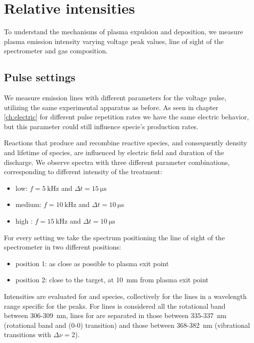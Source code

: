 \section{Relative intensities}
To understand the mechanisms of plasma expulsion and deposition, we measure plasma emission intensity varying voltage peak values, line of sight of the spectrometer and gas composition.


\subsection{Pulse settings}
We measure emission lines with different parameters for the voltage pulse, utilizing the same experimental apparatus as before. As seen in chapter \ref{ch:electric} for different pulse repetition rates we have the same electric behavior, but this parameter could still influence specie's production rates.

Reactions that produce and recombine reactive species, and consequently density and lifetime of species, are influenced by electric field and duration of the discharge. We observe spectra with three different parameter combinations, corresponding to different intensity of the treatment:
\begin{itemize}
 \item low: $f = \SI{5}{\kilo\hertz}$ and $\Delta t = \SI{15}{\micro\second}$
 \item medium: $f = \SI{10}{\kilo\hertz}$ and $\Delta t = \SI{10}{\micro\second}$
 \item high : $f = \SI{15}{\kilo\hertz}$ and $\Delta t = \SI{10}{\micro\second}$
\end{itemize}

For every setting we take the spectrum positioning the line of sight of the spectrometer in two different positions:
\begin{itemize}
 \item position 1: as close as possible to plasma exit point
 \item position 2: close to the target, at \SI{10}{\milli\meter} from plasma exit point
\end{itemize}

Intensities are evaluated for  and  species, collectively for the lines in a wavelength range specific for the peaks. For  lines is considered all the rotational band between $\num{306}$-\SI{309}{\nano\meter}, lines for  are separated in those between $\num{335}$-\SI{337}{\nano\meter} (rotational band and (0-0) transition) and those between $\num{368}$-\SI{382}{\nano\meter} (vibrational transitions with $\Delta \nu = 2$).



